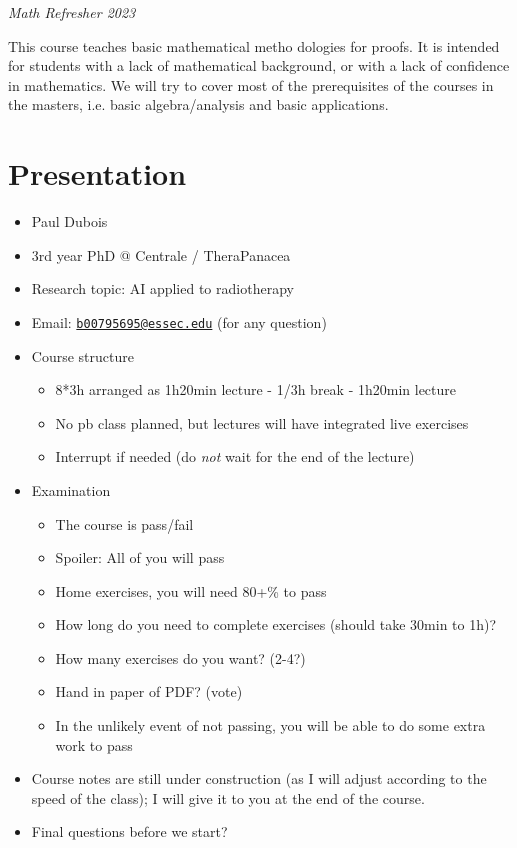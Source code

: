 
\emph{Math Refresher 2023}

This course teaches basic mathematical metho dologies for proofs. It is
intended for students with a lack of mathematical background, or with a
lack of confidence in mathematics. We will try to cover most of the
prerequisites of the courses in the master\textquotesingle s, i.e. basic
algebra/analysis and basic applications.

\hypertarget{presentation}{%
\section{Presentation}\label{presentation}}

\begin{itemize}
\tightlist
\item
  Paul Dubois
\item
  3rd year PhD @ Centrale / TheraPanacea
\item
  Research topic: AI applied to radiotherapy
\item
  Email:
  \href{mailto:b00795695@essec.edu}{\nolinkurl{b00795695@essec.edu}}
  (for any question)
\item
  Course structure

  \begin{itemize}
  \tightlist
  \item
    8*3h arranged as 1h20min lecture - 1/3h break - 1h20min lecture
  \item
    No pb class planned, but lectures will have integrated live
    exercises
  \item
    Interrupt if needed (do \emph{not} wait for the end of the lecture)
  \end{itemize}
\item
  Examination

  \begin{itemize}
  \tightlist
  \item
    The course is pass/fail
  \item
    Spoiler: All of you will pass
  \item
    Home exercises, you will need 80+\% to pass
  \item
    How long do you need to complete exercises (should take 30min to
    1h)?
  \item
    How many exercises do you want? (2-4?)
  \item
    Hand in paper of PDF? (vote)
  \item
    In the unlikely event of not passing, you will be able to do some
    extra work to pass
  \end{itemize}
\item
  Course notes are still under construction (as I will adjust according
  to the speed of the class); I will give it to you at the end of the
  course.
\item
  Final questions before we start?
\end{itemize}

